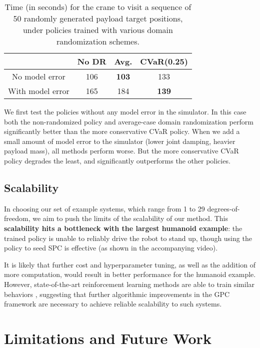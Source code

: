 \documentclass[letterpaper, 10 pt]{ieeeconf}
\begin{document}
\begin{table}[h]
    \centering
    \begin{tabular}{c|ccc}
        & No DR & Avg. & CVaR(0.25) \\
        \hline
         No model error & 106 & \textbf{103} & 133   \\
        \hline
         With model error & 165 & 184 & \textbf{139}
    \end{tabular}
    \caption{Time (in seconds) for the crane to visit a sequence of 50 randomly generated payload target positions, under policies trained with various domain randomization schemes.}
    \label{tab:crane_dr}
\end{table}

We first test the policies without any model error in the simulator. In this case both the non-randomized policy and average-case domain randomization perform significantly better than the more conservative CVaR policy. When we add a small amount of model error to the simulator (lower joint damping, heavier payload mass), all methods perform worse. But the more conservative CVaR policy degrades the least, and significantly outperforms the other policies. 

\subsection{Scalability}\label{sec:scalability}

In choosing our set of example systems, which range from 1 to 29 degrees-of-freedom, we aim to push the limits of the scalability of our method. This \textbf{scalability hits a bottleneck with the largest humanoid example}: the trained policy is unable to reliably drive the robot to stand up, though using the policy to seed SPC is effective (as shown in the accompanying video).

It is likely that further cost and hyperparameter tuning, as well as the addition of more computation, would result in better performance for the humanoid example. However, state-of-the-art reinforcement learning methods are able to train similar behaviors \cite{freeman2021brax, raffin2021stable}, suggesting that further algorithmic improvements in the GPC framework are necessary to achieve reliable scalability to such systems.

\section{Limitations and Future Work}\label{sec:limitations}
\end{document}
